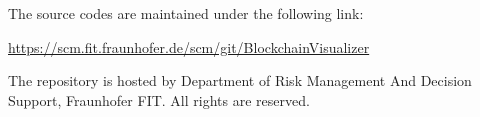 The source codes are maintained under the following link:

\url{https://scm.fit.fraunhofer.de/scm/git/BlockchainVisualizer}

The repository is hosted by Department of Risk Management And Decision Support, Fraunhofer FIT. All rights are reserved.

